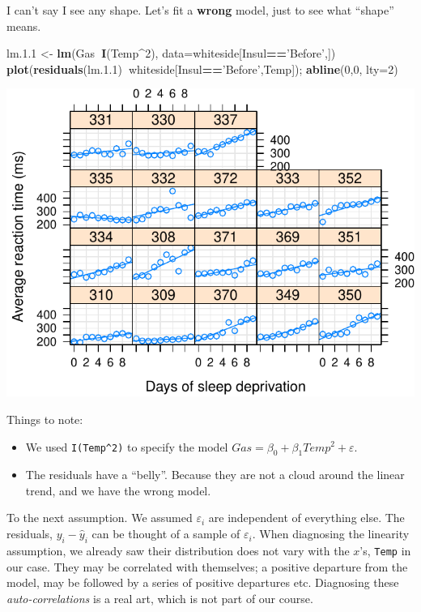 \documentclass[]{book}
\newenvironment{Shaded}{\begin{snugshade}}{\end{snugshade}}
\newcommand{\KeywordTok}[1]{\textcolor[rgb]{0.13,0.29,0.53}{\textbf{#1}}}
\newcommand{\DataTypeTok}[1]{\textcolor[rgb]{0.13,0.29,0.53}{#1}}
\newcommand{\DecValTok}[1]{\textcolor[rgb]{0.00,0.00,0.81}{#1}}
\newcommand{\FloatTok}[1]{\textcolor[rgb]{0.00,0.00,0.81}{#1}}
\newcommand{\StringTok}[1]{\textcolor[rgb]{0.31,0.60,0.02}{#1}}
\newcommand{\OperatorTok}[1]{\textcolor[rgb]{0.81,0.36,0.00}{\textbf{#1}}}
\newcommand{\NormalTok}[1]{#1}
\providecommand{\tightlist}{%
  \setlength{\itemsep}{0pt}\setlength{\parskip}{0pt}}
\theoremstyle{definition}
\theoremstyle{definition}
\theoremstyle{definition}
\theoremstyle{remark}
\begin{document}
I can't say I see any shape. Let's fit a \textbf{wrong} model, just to
see what ``shape'' means.

\begin{Shaded}
\begin{Highlighting}[]
\NormalTok{lm.}\FloatTok{1.1}\NormalTok{ <-}\StringTok{ }\KeywordTok{lm}\NormalTok{(Gas}\OperatorTok{~}\KeywordTok{I}\NormalTok{(Temp}\OperatorTok{^}\DecValTok{2}\NormalTok{), }\DataTypeTok{data=}\NormalTok{whiteside[Insul}\OperatorTok{==}\StringTok{'Before'}\NormalTok{,])}
\KeywordTok{plot}\NormalTok{(}\KeywordTok{residuals}\NormalTok{(lm.}\FloatTok{1.1}\NormalTok{)}\OperatorTok{~}\NormalTok{whiteside[Insul}\OperatorTok{==}\StringTok{'Before'}\NormalTok{,Temp]); }\KeywordTok{abline}\NormalTok{(}\DecValTok{0}\NormalTok{,}\DecValTok{0}\NormalTok{, }\DataTypeTok{lty=}\DecValTok{2}\NormalTok{)}
\end{Highlighting}
\end{Shaded}

\includegraphics[width=0.5\linewidth]{Rcourse_files/figure-latex/unnamed-chunk-162-1}

Things to note:

\begin{itemize}
\tightlist
\item
  We used \texttt{I(Temp\^{}2)} to specify the model
  \(Gas=\beta_0 + \beta_1 Temp^2+ \varepsilon\).
\item
  The residuals have a ``belly''. Because they are not a cloud around
  the linear trend, and we have the wrong model.
\end{itemize}

To the next assumption. We assumed \(\varepsilon_i\) are independent of
everything else. The residuals, \(y_i-\hat y_i\) can be thought of a
sample of \(\varepsilon_i\). When diagnosing the linearity assumption,
we already saw their distribution does not vary with the \(x\)'s,
\texttt{Temp} in our case. They may be correlated with themselves; a
positive departure from the model, may be followed by a series of
positive departures etc. Diagnosing these \emph{auto-correlations} is a
real art, which is not part of our course.
\end{document}
